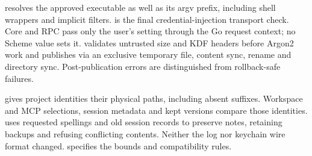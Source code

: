  resolves the approved executable as well as its
argv prefix, including shell wrappers and implicit filters.
 is the final credential-injection transport
check. Core and RPC pass only the user's 
setting through the Go request context; no Scheme value sets it.
 validates untrusted size and KDF headers before
Argon2 work and publishes via an exclusive temporary file, content sync, rename
and directory sync. Post-publication errors are distinguished from rollback-safe
failures.

 gives project identities their physical paths,
including absent suffixes. Workspace and MCP selections, session metadata and
kept versions compare those identities. 
uses requested spellings and old session records to preserve notes, retaining
backups and refusing conflicting contents. Neither the log nor keychain wire
format changed.  specifies the bounds and compatibility rules.
